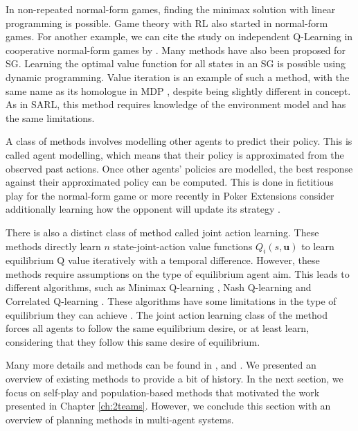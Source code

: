 In non-repeated normal-form games, finding the minimax solution with linear programming \citep{marl-book} is possible.
Game theory with RL also started in normal-form games.
For another example, we can cite the study on independent Q-Learning in cooperative normal-form games by \cite{claus1998dynamics}.
Many methods have also been proposed for SG.
Learning the optimal value function for all states in an SG is possible using dynamic programming.
Value iteration \citep{stochasticGames} is an example of such a method, with the same name as its homologue in MDP \citep{sutton2018reinforcement}, despite being slightly different in concept.
As in SARL, this method requires knowledge of the environment model and has the same limitations.

A class of methods involves modelling other agents to predict their policy.
This is called agent modelling, which means that their policy is approximated from the observed past actions.
Once other agents' policies are modelled, the best response against their approximated policy can be computed.
This is done in fictitious play \citep{brown1951iterative} for the normal-form game or more recently in Poker \citep{pmlr-v37-heinrich15} 
Extensions consider additionally learning how the opponent will update its strategy \citep{he2016opponent, foerster2017lola}.

There is also a distinct class of method called joint action learning.
These methods directly learn $n$ state-joint-action value functions $Q_i(s, \mathbf{u})$ to learn equilibrium Q value iteratively with a temporal difference.
However, these methods require assumptions on the type of equilibrium agent aim.
This leads to different algorithms, such as Minimax Q-learning \citep{MarkovGames}, Nash Q-learning \citep{hu2003nash} and Correlated Q-learning \citep{greenwald2003correlated}.
These algorithms have some limitations in the type of equilibrium they can achieve \citep{marl-book}.
The joint action learning class of the method forces all agents to follow the same equilibrium desire, or at least learn, considering that they follow this same desire of equilibrium.

Many more details and methods can be found in \citep{marl-book}, \citep{Nowe2012GTMARL} and \citep{russel2010}.
We presented an overview of existing methods to provide a bit of history.
In the next section, we focus on self-play and population-based methods that motivated the work presented in Chapter \ref{ch:2teams}.
However, we conclude this section with an overview of planning methods in multi-agent systems.

